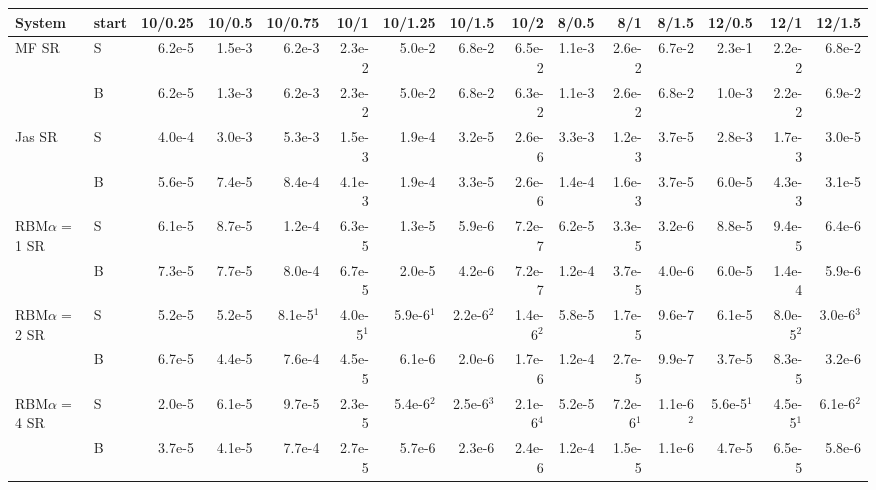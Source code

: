 \begin{tabular}{llrrrrrrrrrrrrr}\toprule
System & start & 10/0.25 & 10/0.5 & 10/0.75 & 10/1 & 10/1.25 & 10/1.5 & 10/2 & 8/0.5 & 8/1 & 8/1.5 & 12/0.5 & 12/1 & 12/1.5 \\\midrule
MF SR & S & 6.2e-5 & 1.5e-3 & 6.2e-3 & 2.3e-2 & 5.0e-2 & 6.8e-2 & 6.5e-2 & 1.1e-3 & 2.6e-2 & 6.7e-2 & 2.3e-1 & 2.2e-2 & 6.8e-2 \\
 & B & 6.2e-5 & 1.3e-3 & 6.2e-3 & 2.3e-2 & 5.0e-2 & 6.8e-2 & 6.3e-2 & 1.1e-3 & 2.6e-2 & 6.8e-2 & 1.0e-3 & 2.2e-2 & 6.9e-2 \\
Jas SR & S & 4.0e-4 & 3.0e-3 & 5.3e-3 & 1.5e-3 & 1.9e-4 & 3.2e-5 & 2.6e-6 & 3.3e-3 & 1.2e-3 & 3.7e-5 & 2.8e-3 & 1.7e-3 & 3.0e-5 \\
 & B & 5.6e-5 & 7.4e-5 & 8.4e-4 & 4.1e-3 & 1.9e-4 & 3.3e-5 & 2.6e-6 & 1.4e-4 & 1.6e-3 & 3.7e-5 & 6.0e-5 & 4.3e-3 & 3.1e-5 \\
RBM$\alpha{=}$1 SR & S & 6.1e-5 & 8.7e-5 & 1.2e-4 & 6.3e-5 & 1.3e-5 & 5.9e-6 & 7.2e-7 & 6.2e-5 & 3.3e-5 & 3.2e-6 & 8.8e-5 & 9.4e-5 & 6.4e-6 \\
 & B & 7.3e-5 & 7.7e-5 & 8.0e-4 & 6.7e-5 & 2.0e-5 & 4.2e-6 & 7.2e-7 & 1.2e-4 & 3.7e-5 & 4.0e-6 & 6.0e-5 & 1.4e-4 & 5.9e-6 \\
RBM$\alpha{=}$2 SR & S & 5.2e-5 & 5.2e-5 & 8.1e-5$^{1}$ & 4.0e-5$^{1}$ & 5.9e-6$^{1}$ & 2.2e-6$^{2}$ & 1.4e-6$^{2}$ & 5.8e-5 & 1.7e-5 & 9.6e-7 & 6.1e-5 & 8.0e-5$^{2}$ & 3.0e-6$^{3}$ \\
 & B & 6.7e-5 & 4.4e-5 & 7.6e-4 & 4.5e-5 & 6.1e-6 & 2.0e-6 & 1.7e-6 & 1.2e-4 & 2.7e-5 & 9.9e-7 & 3.7e-5 & 8.3e-5 & 3.2e-6 \\
RBM$\alpha{=}$4 SR & S & 2.0e-5 & 6.1e-5 & 9.7e-5 & 2.3e-5 & 5.4e-6$^{2}$ & 2.5e-6$^{3}$ & 2.1e-6$^{4}$ & 5.2e-5 & 7.2e-6$^{1}$ & 1.1e-6$^{2}$ & 5.6e-5$^{1}$ & 4.5e-5$^{1}$ & 6.1e-6$^{2}$ \\
 & B & 3.7e-5 & 4.1e-5 & 7.7e-4 & 2.7e-5 & 5.7e-6 & 2.3e-6 & 2.4e-6 & 1.2e-4 & 1.5e-5 & 1.1e-6 & 4.7e-5 & 6.5e-5 & 5.8e-6 \\
\bottomrule\end{tabular}
